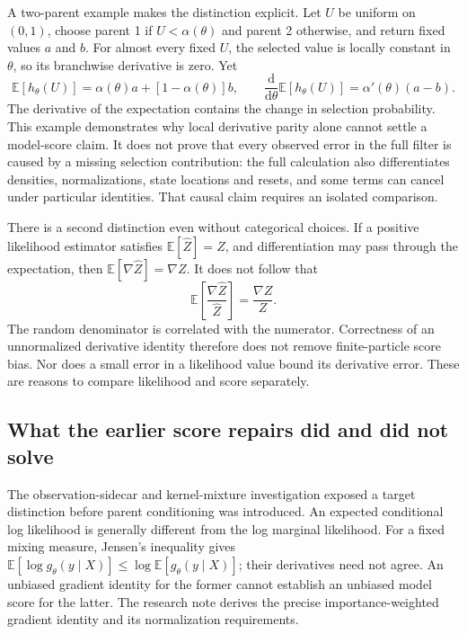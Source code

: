 A two-parent example makes the distinction explicit. Let $U$ be uniform on
$(0,1)$, choose parent 1 if $U<\alpha(\theta)$ and parent 2 otherwise, and
return fixed values $a$ and $b$. For almost every fixed $U$, the selected
value is locally constant in $\theta$, so its branchwise derivative is zero.
Yet
\begin{equation}
 \mathbb E[h_\theta(U)]=\alpha(\theta)a+
               [1-\alpha(\theta)]b,
 \qquad
 \frac{\mathrm d}{\mathrm d\theta}\mathbb E[h_\theta(U)]
       =\alpha'(\theta)(a-b).
\end{equation}
The derivative of the expectation contains the change in selection
probability. This example demonstrates why local derivative parity alone
cannot settle a model-score claim. It does not prove that every observed
error in the full filter is caused by a missing selection contribution:
the full calculation also differentiates densities, normalizations, state
locations and resets, and some terms can cancel under particular identities.
That causal claim requires an isolated comparison.

There is a second distinction even without categorical choices. If a positive
likelihood estimator satisfies $\mathbb E[\widehat Z]=Z$, and differentiation
may pass through the expectation, then
$\mathbb E[\nabla\widehat Z]=\nabla Z$. It does not follow that
\begin{equation}
 \mathbb E\!\left[\frac{\nabla\widehat Z}{\widehat Z}\right]
       =\frac{\nabla Z}{Z}.
\end{equation}
The random denominator is correlated with the numerator. Correctness of an
unnormalized derivative identity therefore does not remove finite-particle
score bias. Nor does a small error in a likelihood value bound its derivative
error. These are reasons to compare likelihood and score separately.

\subsection{What the earlier score repairs did and did not solve}

The observation-sidecar and kernel-mixture investigation exposed a target
distinction before parent conditioning was introduced. An expected
conditional log likelihood is generally different from the log marginal
likelihood. For a fixed mixing measure, Jensen's inequality gives
$\mathbb E[\log g_\theta(y\mid X)]\leq
\log\mathbb E[g_\theta(y\mid X)]$; their derivatives need not agree.
An unbiased gradient identity for the former cannot establish an unbiased
model score for the latter. The research note derives the precise
importance-weighted gradient identity and its normalization requirements.


